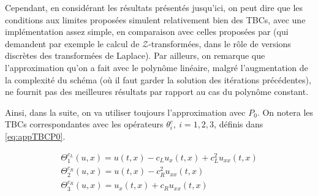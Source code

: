 \indent Cependant, en considérant les résultats présentés jusqu'ici, on peut dire que les conditions aux limites proposées simulent relativement bien des TBCs, avec une implémentation assez simple, en comparaison avec celles proposées par \cite{besse2015} (qui demandent par exemple le calcul de $\mathcal{Z}$-transformées, dans le rôle de versions discrètes des transformées de Laplace). Par ailleurs, on remarque que l'approximation qu'on a fait avec le polynôme linéaire, malgré l'augmentation de la complexité du schéma (où il faut garder la solution des itérations précédentes), ne fournit pas des meilleures résultats par rapport au cas du polynôme constant.

\indent Ainsi, dans la suite, on va utiliser toujours l'approximation avec $P_0$. On notera les TBCs correspondantes avec les opérateurs $\theta_i^c, \ i=1,2,3$, définis dans \eqref{eq:appTBCP0}.

\begin{equation*}
    \begin{gathered}
        \Theta_1^{c_L}(u,x) = u(t,x) - c_L u_x(t,x)  + c_L^2  u_{xx}(t,x) \\
        \Theta_2^{c_R}(u,x) =  u(t,x) - c_R^2    u_{xx}(t,x)\\
        \Theta_3^{c_R} (u,x)= u_x(t,x) + c_R u_{xx}(t,x) 
    \end{gathered}
\end{equation*}